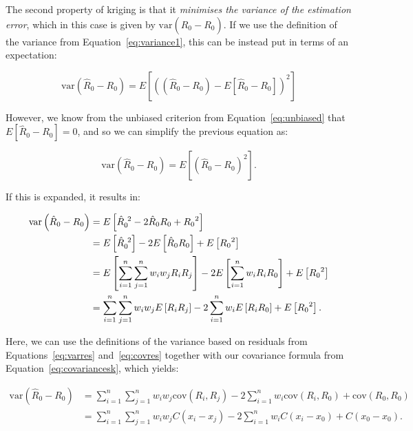 The second property of kriging is that it \emph{minimises the variance of the estimation error}, which in this case is given by \(\mathrm{var}\left(\hat{R}_0 - R_0\right)\).
If we use the definition of the variance from Equation~\ref{eq:variance1}, this can be instead put in terms of an expectation:

\begin{equation}
\mathrm{var}\left(\hat{R}_0 - R_0\right) = E \left[ \left( \left(\hat{R}_0 - R_0\right) - E \left[\hat{R}_0 - R_0\right] \right)^2 \right] \nonumber
\end{equation}

However, we know from the unbiased criterion from Equation~\ref{eq:unbiased} that \(E\left[ \hat{R}_0 - R_0 \right] = 0\), and so we can simplify the previous equation as:

\begin{equation}
\mathrm{var}\left(\hat{R}_0 - R_0\right) = E\left[\left( \hat{R}_0 - R_0 \right)^2\right] \nonumber.
\end{equation}

If this is expanded, it results in:

\begin{align}
\mathrm{var}\left(\hat{R}_0 - R_0\right) &= E\left[{\hat{R}_0}^{\hspace{1.2mm}2} - 2\hat{R}_0R_0 + {R_0}^2 \right] \nonumber \\
&= E\left[{\hat{R}_0}^{\hspace{1.2mm}2}\right] - 2E\left[\hat{R}_0R_0\right] + E\left[{R_0}^2 \right] \nonumber \\
&= E\left[\sum_{i=1}^n \sum_{j=1}^n w_i w_j R_i R_j\right] - 2E\left[\sum_{i=1}^n w_i R_i R_0\right] + E\left[{R_0}^2 \right] \nonumber \\
&= \sum_{i=1}^n \sum_{j=1}^n w_i w_j E\left[R_i R_j\right] - 2\sum_{i=1}^n w_i E\left[R_i R_0\right] + E\left[{R_0}^2 \right]. \nonumber
\end{align}

Here, we can use the definitions of the variance based on residuals from Equations~\ref{eq:varres} and~\ref{eq:covres} together with our covariance formula from Equation~\ref{eq:covariancesk}, which yields:

\begin{align}
\mathrm{var}\left(\hat{R}_0 - R_0\right) &= \sum_{i=1}^n \sum_{j=1}^n w_i w_j \mathrm{cov}(R_i, R_j) - 2\sum_{i=1}^n w_i \mathrm{cov}(R_i,R_0) + \mathrm{cov}(R_0, R_0) \label{eq:variancesk} \\
&= \sum_{i=1}^n \sum_{j=1}^n w_i w_j C(x_i-x_j) - 2\sum_{i=1}^n w_i C(x_i-x_0) + C(x_0-x_0).
\end{align}

